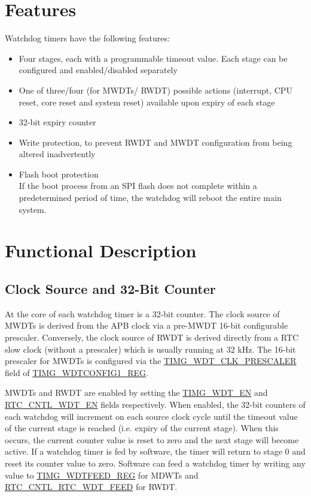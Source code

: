 \documentclass[main\_\_EN.tex]{subfiles}
\begin{document}
\section{Features}
Watchdog timers have the following features:
\begin{itemize}
    \item Four stages, each with a programmable timeout value. Each stage can be configured and enabled/disabled separately
    \item One of three/four (for MWDTs/ RWDT) possible actions (interrupt, CPU reset, core reset and system reset) available upon expiry of each stage
    \item 32-bit expiry counter
    \item Write protection, to prevent RWDT and MWDT configuration from being altered inadvertently
    \item Flash boot protection\\
    If the boot process from an SPI flash does not complete within a predetermined period of time, the watchdog will reboot the entire main system.
\end{itemize}

\section{Functional Description}
\subsection{Clock Source and 32-Bit Counter}

At the core of each watchdog timer is a 32-bit counter. The clock source of MWDTs is derived from the APB clock via a pre-MWDT 16-bit configurable prescaler. Conversely, the clock source of RWDT is derived directly from a RTC slow clock (without a prescaler) which is usually running at 32 kHz. The 16-bit prescaler for MWDTs is configured via the \hyperref[fielddesc:TIMGWDTCLKPRESCALER]{TIMG\_WDT\_CLK\_PRESCALER} field of \hyperref[regdesc:TIMGWDTCONFIG1REG]{TIMG\_WDTCONFIG1\_REG}.


MWDTs and RWDT are enabled by setting the \hyperref[fielddesc:TIMGWDTEN]{TIMG\_WDT\_EN} and \hyperref[fielddesc:RTCCNTLWDTEN]{RTC\_CNTL\_WDT\_EN} fields respectively. When enabled, the 32-bit counters of each watchdog will increment on each source clock cycle until the timeout value of the current stage is reached (i.e. expiry of the current stage). When this occurs, the current counter value is reset to zero and the next stage will become active.  If a watchdog timer is fed by software, the timer will return to stage 0 and reset its counter value to zero. Software can feed a watchdog timer by writing any value to \hyperref[regdesc:TIMGWDTFEEDREG]{TIMG\_WDTFEED\_REG} for MDWTs and \hyperref[fielddesc:RTCCNTLRTCWDTFEED]{RTC\_CNTL\_RTC\_WDT\_FEED} for RWDT.
\end{document}
